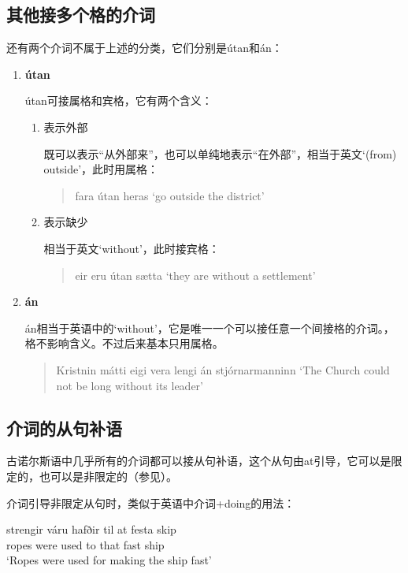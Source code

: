 \subsection{其他接多个格的介词}
还有两个介词不属于上述的分类，它们分别是útan和án：
\begin{enumerate}[itemindent=1em, label=\textbf{\arabic*}.]
    \item \textbf{útan}

          útan可接属格和宾格，它有两个含义：
          \begin{enumerate}
              \item 表示外部

                    既可以表示“从外部来”，也可以单纯地表示“在外部”，相当于英文`(from) outside'，此时用属格：
                    \begin{quote}
                        fara útan hera\dh s `go outside the district'
                    \end{quote}

              \item 表示缺少

                    相当于英文`without'，此时接宾格：
                    \begin{quote}
                        \th eir eru útan sætta `they are without a settlement'
                    \end{quote}
          \end{enumerate}

    \item \textbf{án}

          án相当于英语中的`without'，它是唯一一个可以接任意一个间接格的介词。，格不影响含义。不过后来基本只用属格。
          \begin{quote}
              Kristnin mátti eigi vera lengi án stjórnarmanninn `The Church could not be long without its leader'
          \end{quote}
\end{enumerate}

\subsection{介词的从句补语}
古诺尔斯语中几乎所有的介词都可以接从句补语，这个从句由at引导，它可以是限定的，也可以是非限定的（参见）。

介词引导非限定从句时，类似于英语中介词+doing的用法：
\begin{exe}
    \ex \gll
    strengir váru hafðir til at festa skip\\
    ropes were used to that fast ship\\
    \trans `Ropes were used for making the ship fast'
\end{exe}

